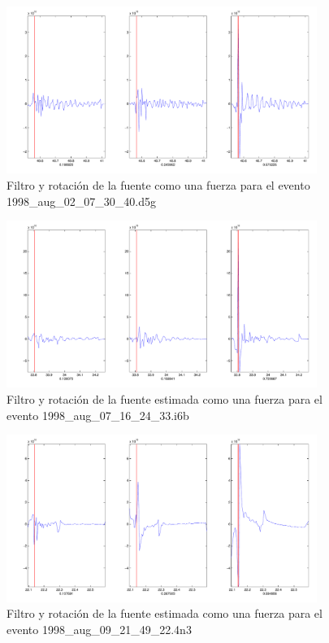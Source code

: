\begin{figure}[H]
\includegraphics[width=0.9\textwidth,height=0.4\textheight]{linea_timerev/figuras/plotSrcEv1filtrotsrc.pdf}
\caption{Filtro y rotación de la fuente como una fuerza para el
evento 1998\_aug\_02\_07\_30\_40.d5g}
\end{figure}
\begin{figure}[H]
\includegraphics[width=0.9\textwidth,height=0.4\textheight]{linea_timerev/figuras/plotSrcEv2filtrotsrc.pdf}
\caption{Filtro y rotación de la fuente estimada como una fuerza para el
evento 1998\_aug\_07\_16\_24\_33.i6b}
\end{figure}
\begin{figure}[H]
\includegraphics[width=0.9\textwidth,height=0.4\textheight]{linea_timerev/figuras/plotSrcEv3filtrotsrc.pdf}
\caption{Filtro y rotación de la fuente estimada como una fuerza para el
evento 1998\_aug\_09\_21\_49\_22.4n3}
\end{figure}
